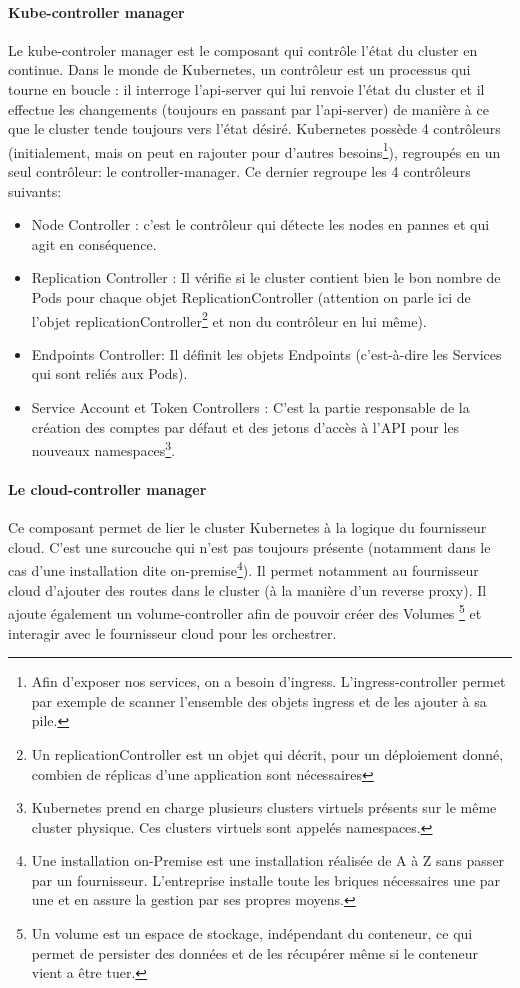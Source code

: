\documentclass[11pt,fleqn]{book} %
\begin{document}
\paragraph*{Kube-controller manager}
Le kube-controler manager est le composant qui contrôle l'état du cluster en continue. Dans le monde de Kubernetes, un contrôleur est un processus qui tourne en boucle : il interroge l'api-server qui lui renvoie l'état du cluster et il effectue les changements (toujours en passant par l'api-server) de manière à ce que le cluster tende toujours vers l'état désiré. Kubernetes possède 4 contrôleurs (initialement, mais on peut en rajouter pour d'autres besoins\footnote{Afin d'exposer nos services, on a besoin d'ingress. L'ingress-controller permet par exemple de scanner l'ensemble des objets ingress et de les ajouter à sa pile.}), regroupés en un seul contrôleur: le controller-manager. Ce dernier regroupe les 4 contrôleurs suivants: 
\begin{itemize}
    \item Node Controller : c'est le contrôleur qui détecte les nodes en pannes et qui agit en conséquence.
    \item Replication Controller : Il vérifie si le cluster contient bien le bon nombre de Pods pour chaque objet ReplicationController (attention on parle ici de l'objet replicationController\footnote{Un replicationController est un objet qui décrit, pour un déploiement donné, combien de réplicas d'une application sont nécessaires} et non du contrôleur en lui même).
    \item Endpoints Controller: Il définit les objets Endpoints (c’est-à-dire les Services qui sont reliés aux Pods).
    \item Service Account et Token Controllers : C'est la partie responsable de la création des comptes par défaut et des jetons d'accès à l'API pour les nouveaux namespaces\footnote{Kubernetes prend en charge plusieurs clusters virtuels présents sur le même cluster physique. Ces clusters virtuels sont appelés namespaces.}.
\end{itemize}

\paragraph{Le cloud-controller manager}
Ce composant permet de lier le cluster Kubernetes à la logique du fournisseur cloud. C'est une surcouche qui n'est pas toujours présente (notamment dans le cas d'une installation dite on-premise\footnote{Une installation on-Premise est une installation réalisée de A à Z sans passer par un fournisseur. L'entreprise installe toute les briques nécessaires une par une et en assure la gestion par ses propres moyens.}). Il permet notamment au fournisseur cloud d'ajouter des routes dans le cluster (à la manière d'un reverse proxy). Il ajoute également un volume-controller afin de pouvoir créer des Volumes \footnote{Un volume est un espace de stockage, indépendant du conteneur, ce qui permet de persister des données et de les récupérer même si le conteneur vient a être tuer.} et interagir avec le fournisseur cloud pour les orchestrer.
\end{document}
